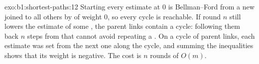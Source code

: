 \begin{solution}{exo:b1:shortest-paths:12}
Starting every estimate at 0 is Bellman--Ford from a new  joined to all others by  of weight 0, so every
cycle is reachable. If round $n$ still lowers the estimate of some , the parent links contain a cycle: following
them back $n$ steps from that  cannot avoid repeating a . On a cycle of parent links, each estimate was set
from the next one along the cycle, and summing the inequalities shows that its weight is negative. The cost is $n$
rounds of $O(m)$.
\end{solution}

